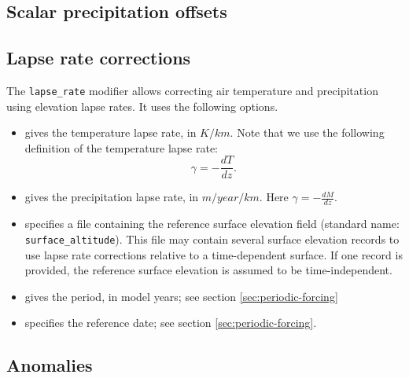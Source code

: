 \documentclass[titlepage,letterpaper,final]{scrartcl}
\begin{document}

\subsection{Scalar precipitation offsets}
\label{sec:atmosphere-delta-precip}


\subsection{Lapse rate corrections}
\label{sec:atmosphere-lapse-rates}

The \texttt{lapse_rate} modifier allows correcting air temperature and
precipitation using elevation lapse rates. It uses the following options.

\begin{itemize}
\item {} gives the temperature lapse rate, in
  $K/km$. Note that we use the following definition of the temperature lapse
  rate:
  \begin{displaymath}
    \gamma = -\frac{dT}{dz}.
  \end{displaymath}
\item {} gives the precipitation lapse rate, in
  $m/year/km$. Here $\gamma = -\frac{dM}{dz}$.
\item {} specifies a file containing the
  reference surface elevation field (standard name:
  \texttt{surface_altitude}). This file may contain several surface elevation
  records to use lapse rate corrections relative to a time-dependent surface.
  If one record is provided, the reference surface elevation is assumed to be
  time-independent.
\item {} gives the period, in model
  years; see section \ref{sec:periodic-forcing}
\item {} specifies the reference date; see section \ref{sec:periodic-forcing}.
\end{itemize}


\subsection{Anomalies}
\label{sec:atmosphere-anomaly}
\end{document}
